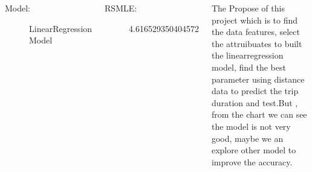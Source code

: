 \documentclass{tikzposter} %
\begin{document}
\begin{columns}
{}


{
\begin{description}
  	\item[Model:] LinearRegression Model
    
\end{description}
\vspace{.5cm}
\begin{description}
  	\item[RSMLE:] 4.616529350404572
    
\end{description}

}


{
\begin{description}
\item
  The Propose of this project which is to find the data features, select the attruibuates to built the linearregression model, find the best parameter using distance data to predict the trip duration and test.But , from the chart we can see the model is not very good, maybe we an explore other model to improve the accuracy.
\end{description}
}






\end{columns}


\end{document}
